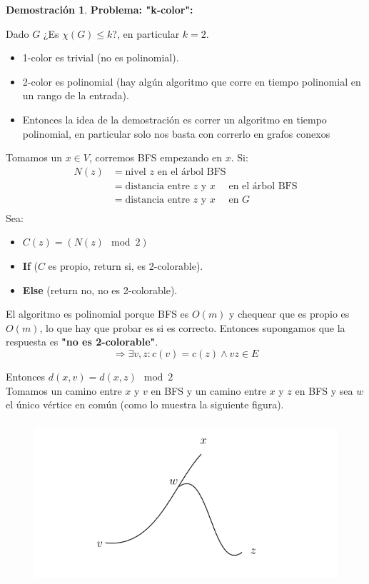 \documentclass[11pt, a4paper]{article}
\theoremstyle{definition}
\newtheorem*{demostracion}{Demostración}
\begin{document}
\begin{demostracion}
    
    \textbf{Problema: "k-color":} 
    
    Dado $G$ ¿Es $\chi(G) \leq k$?, en particular $k=2$. 
    
    \begin{itemize}
        \item 1-color es trivial (no es polinomial).
        \item 2-color es polinomial (hay algún algoritmo que corre en tiempo polinomial en un rango de la entrada). 
        \item Entonces la idea de la demostración es correr un algoritmo en tiempo polinomial, en particular solo nos basta con correrlo en grafos conexos
    \end{itemize}
    Tomamos un $x \in V$, corremos BFS empezando en $x$. Si:
    \begin{align*}
        N(z) &= \text{nivel } z \text{ en el árbol BFS} \\[6pt]
             &= \text{distancia entre } z \text{ y } x \quad  \text{ en el árbol BFS} \\[6pt]
             &= \text{distancia entre } z \text{ y } x \quad  \text{ en } G \\[6pt]
    \end{align*}
    Sea:
    \begin{itemize}
        \item $C(z) = (N(z) \mod 2)$
        \item \textbf{If} ($C$ es propio, return si, es 2-colorable).
        \item \textbf{Else} (return no, no es 2-colorable).
    \end{itemize}
    El algoritmo es polinomial porque BFS es $O(m)$ y chequear que es propio es $O(m)$, lo que hay que probar es si es correcto. Entonces supongamos que la respuesta es \textbf{"no es 2-colorable"}.    
    \[
    \Rightarrow \exists v, z : c(v) = c(z) \land vz \in E
    \]

    Entonces $d(x, v) = d(x, z) \mod 2$\\
    Tomamos un camino entre $x$ y $v$ en BFS y un camino entre $x$ y $z$ en BFS y sea $w$ el único vértice en común (como lo muestra la siguiente figura).
    \begin{figure}[!ht]
        \centering 
        \includegraphics[height=6cm]{Figure 1 2-color.png} 
    \end{figure}


\end{demostracion}
\end{document}
